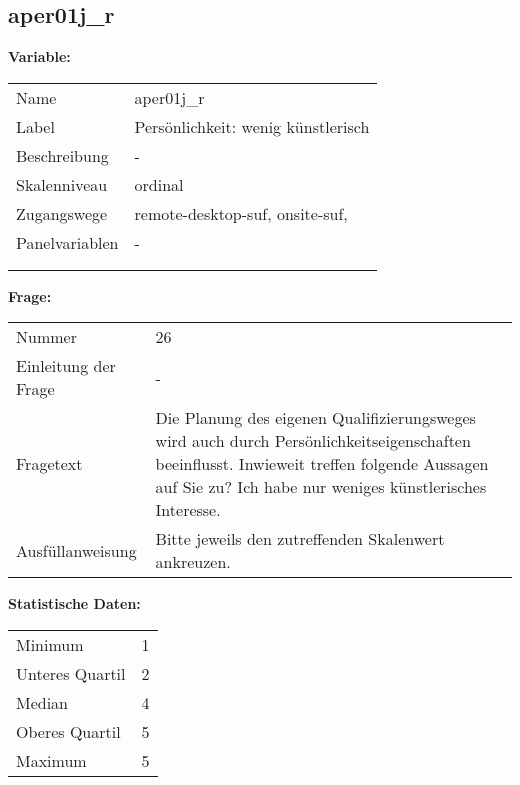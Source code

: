 	
	
	\subsection{aper01j\_r}
	\label{subSection:aper01j_r}

	\noindent\textbf{Variable:}\\
		\begin{tabular}{lL{11.3cm}}
			\label{tableVariable:aper01j_r}
			Name & aper01j\_r \\
			Label & Persönlichkeit: wenig künstlerisch \\
			Beschreibung & - \\
			Skalenniveau & ordinal \\
			Zugangswege &
				remote-desktop-suf,
				onsite-suf,
 \\
			Panelvariablen & -
			 \\
			 \\
 \\
		\end{tabular}

		\vspace*{1 cm}
		\noindent\textbf{Frage:}\\
		\begin{tabular}{lL{11.3cm}}
			\label{tableQuestion:aper01j_r}
			Nummer & 26 \\
			Einleitung der Frage & - \\
			Fragetext & Die Planung des eigenen Qualifizierungsweges wird auch durch Persönlichkeitseigenschaften beeinflusst. Inwieweit treffen folgende Aussagen auf Sie zu?
Ich habe nur weniges künstlerisches Interesse. \\
			Ausfüllanweisung & Bitte jeweils den zutreffenden
Skalenwert ankreuzen. \\
		\end{tabular}


		\vspace*{1 cm}
		\noindent\textbf{Statistische Daten:}\\
			\begin{tabular}{ll}
				\label{tableStatistics:aper01j_r}
					Minimum & 1 \\
					Unteres Quartil & 2 \\
					Median & 4 \\
					Oberes Quartil & 5 \\
					Maximum & 5 \\
			\end{tabular}




